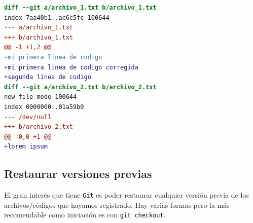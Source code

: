 \documentclass[a4paper,10pt]{article}
\begin{document}
\begin{enumerate}
\begin{itemize}
      \begin{lstlisting}[language=diff]
diff --git a/archivo_1.txt b/archivo_1.txt
index 7aa40b1..ac6c5fc 100644
--- a/archivo_1.txt
+++ b/archivo_1.txt
@@ -1 +1,2 @@
-mi primera linea de codigo
+mi primera linea de codigo corregida
+segunda linea de codigo
diff --git a/archivo_2.txt b/archivo_2.txt
new file mode 100644
index 0000000..01a59b0
--- /dev/null
+++ b/archivo_2.txt
@@ -0,0 +1 @@
+lorem ipsum

      \end{lstlisting}
      
    \end{itemize}
    \end{enumerate}
  \subsection{Restaurar versiones previas}
    El gran interés que tiene \verb+Git+ es poder restaurar cualquier versión previa de los archivos/códigos que hayamos registrado. Hay varias formas pero la más recomendable como iniciación es con \verb+git checkout+.
    
\end{document}
